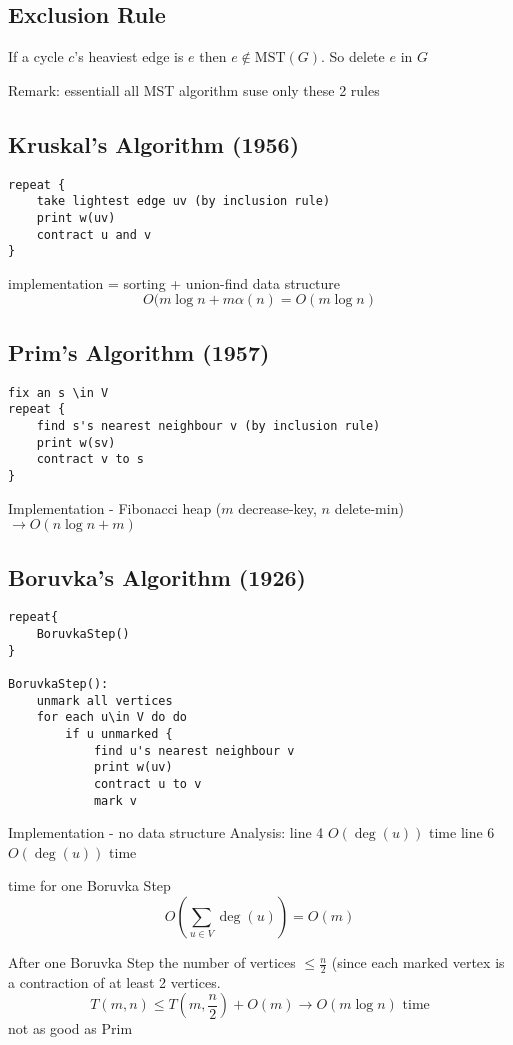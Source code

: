 \documentclass[english,12pt]{article}
\theoremstyle{plain}
\theoremstyle{definition}
\theoremstyle{definition} %
\begin{document}
\subsection{Exclusion Rule}
If a cycle $c$'s heaviest edge is $e$ then $e\not\in\text{MST}(G)$.  So delete $e$ in $G$


Remark: essentiall all MST algorithm suse only these 2 rules

\subsection{Kruskal's Algorithm (1956)}
\begin{verbatim}
repeat {
    take lightest edge uv (by inclusion rule)
    print w(uv)
    contract u and v
}
\end{verbatim}
implementation = sorting + union-find data structure
\[O(m\log n +m\alpha(n)=O(m\log n)\]


\subsection{Prim's Algorithm (1957)}
\begin{verbatim}
fix an s \in V
repeat {
    find s's nearest neighbour v (by inclusion rule)
    print w(sv)
    contract v to s
}
\end{verbatim}

Implementation - Fibonacci heap
($m$ decrease-key, $n$ delete-min) $\rightarrow O(n\log n + m)$

\subsection{Boruvka's Algorithm (1926)}
\begin{verbatim}
repeat{
    BoruvkaStep()
}

BoruvkaStep():
    unmark all vertices
    for each u\in V do do
        if u unmarked {
            find u's nearest neighbour v
            print w(uv)
            contract u to v
            mark v
\end{verbatim}

Implementation - no data structure
Analysis: line 4 $O(\deg(u))$ time
line 6 $O(\deg(u))$ time

time for one Boruvka Step
\[O(\sum_{u\in V}\deg(u))=O(m)\]

After one Boruvka Step the number of vertices $\le \frac{n}{2}$ (since each marked vertex is a contraction of at least 2 vertices.
\[T(m,n)\le T(m,\frac{n}{2})+O(m)\rightarrow O(m\log n)\text{ time}\]
not as good as Prim
\end{document}
